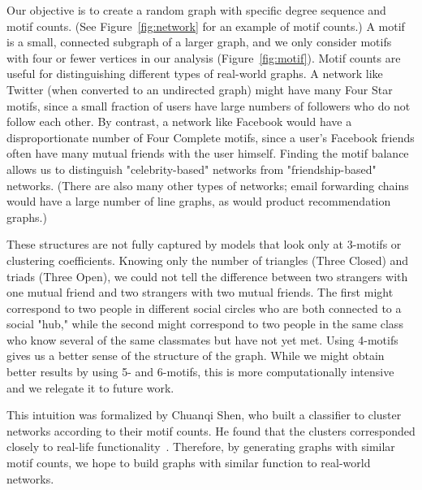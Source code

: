 Our objective is to create a random graph with specific degree sequence and
motif counts.  (See Figure~\ref{fig:network} for an example of motif
counts.)  A motif is a small, connected subgraph of a larger graph,
and we only consider motifs with four or fewer vertices in our analysis 
(Figure~\ref{fig:motif}).  Motif counts are useful for distinguishing different
types of real-world graphs.  A network like Twitter (when converted to an
undirected graph) might have many Four
Star motifs, since a small fraction of users have large numbers of
followers who do not follow each other.  By contrast, a network like
Facebook would have a disproportionate number of Four Complete motifs, 
since a user's Facebook friends often have many mutual friends with the
user himself.  Finding the motif balance allows us to distinguish
"celebrity-based" networks from "friendship-based" networks.  (There are
also many other types of networks; email forwarding chains would have a
large number of line graphs, as would product recommendation graphs.)

These structures are not fully captured by models that look only at
3-motifs or clustering coefficients.  Knowing only the number of triangles
(Three Closed) and triads (Three Open), we could not tell the difference
between two strangers with one mutual friend and two strangers with two
mutual friends.  The first might correspond to two people in different
social circles who are both connected to a social "hub," while the
second might correspond to two people in the same class who know
several of the same classmates but have not yet met.  Using 4-motifs gives
us a better sense of the structure of the graph.  While
we might obtain better results by using 5- and 6-motifs, this is more
computationally intensive and we relegate it to future work.

This intuition was formalized by Chuanqi Shen, who built a classifier to
cluster networks according to their motif counts.  He found that the
clusters corresponded closely to real-life functionality~\cite{chuanqi}.
Therefore, by generating graphs with similar motif counts, we hope to build 
graphs with similar function to real-world networks.
